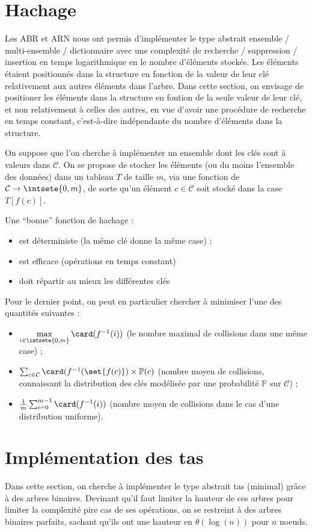 \documentclass{scrartcl}
\begin{document}
	\section{Hachage}
		Les ABR et ARN nous ont permis d'implémenter le type abstrait ensemble / multi-ensemble / dictionnaire avec une complexité de recherche / suppression / insertion en temps logarithmique en le nombre d'éléments stockés. Les éléments étaient positionnés dans la structure en fonction de la valeur de leur clé relativement aux autres éléments dans l'arbre. Dans cette section, on envisage de positioner les éléments dans la structure en fontion de la seule valeur de leur clé, et non relativement à celles des autres, en vue d'avoir une procédure de recherche en temps constant, c'est-à-dire indépendante du nombre d'éléments dans la structure.

		On suppose que l'on cherche à implémenter un ensemble dont les clés sont à valeurs dans $\mathcal{C}$. On se propose de stocker les éléments (ou du moins l'ensemble des données) dans un tableau $T$ de taille $m$, via une fonction de $\mathcal{C} \rightarrow \intsete{0,m}$, de sorte qu'un élément $c \in \mathcal{C}$ soit stocké dans la case $T[f(c)]$.

		Une “bonne” fonction de hachage :
		\begin{itemize}
			\item est déterministe (la même clé donne la même case) ;
			\item est efficace (opérations en temps constant)
			\item doit répartir au mieux les différentes clés
		\end{itemize}
		Pour le dernier point, on peut en particulier chercher à minimiser l’une des quantités suivantes :
		\begin{itemize}
			\item $\mathop{\max}\limits_{i \in \intsete{0,m}} \card(f^{-1}({i}))$ (le nombre maximal de collisions dans une même case) ;
			\item $\sum_{c \in \mathcal{C} } \card(f^{-1}(\set{f(c)}) \times \mathbb{P}(c)$ (nombre moyen de collisions, connaissant la distribution des clés modélisée par une probabilité $\mathbb{P}$ sur $\mathcal{C}$) ;
			\item $\frac{1}{m}\sum_{i=0}^{m-1} \card(f^{-1}(i))$ (nombre moyen de collisions dans le cas d’une distribution uniforme).
		\end{itemize}

	\section{Implémentation des tas}
		Dans cette section, on cherche à implémenter le type abstrait tas (minimal) grâce à des arbres binaires. Devinant qu’il faut limiter la hauteur de ces arbres pour limiter la complexité pire cas de ses opérations, on se restreint à des arbres binaires parfaits, sachant qu’ils ont une hauteur en $\theta(\log(n))$ pour $n$ noeuds.
\end{document}
